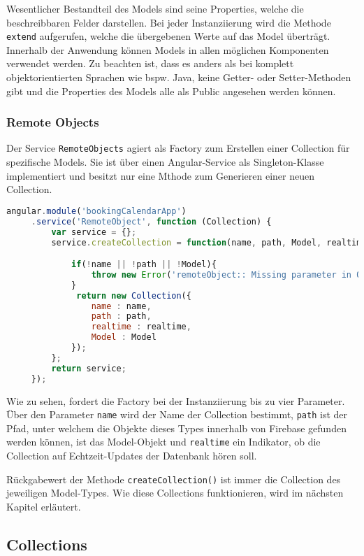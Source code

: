 Wesentlicher Bestandteil des Models sind seine Properties, welche die beschreibbaren Felder darstellen. Bei jeder Instanziierung wird die Methode \texttt{extend\(\)} aufgerufen, welche die
übergebenen Werte auf das Model überträgt.
Innerhalb der Anwendung können Models in allen möglichen Komponenten verwendet werden. Zu beachten ist, dass es anders als bei komplett objektorientierten Sprachen wie bspw. Java,
keine Getter- oder Setter-Methoden gibt und die Properties des Models alle als Public angesehen werden können.


\subsubsection{Remote Objects}
Der Service \texttt{RemoteObjects} agiert als Factory zum Erstellen einer Collection für spezifische Models. Sie ist über einen Angular-Service als Singleton-Klasse implementiert und besitzt
 nur eine Mthode zum Generieren einer neuen Collection.

 \begin{lstlisting}[language=Javascript, label=code_RemoteObject, caption=Code des RemoteObjects-Service]
 angular.module('bookingCalendarApp')
     .service('RemoteObject', function (Collection) {
         var service = {};
         service.createCollection = function(name, path, Model, realtime){

             if(!name || !path || !Model){
                 throw new Error('remoteObject:: Missing parameter in Object')
             }
              return new Collection({
                 name : name,
                 path : path,
                 realtime : realtime,
                 Model : Model
             });
         };
         return service;
     });
\end{lstlisting}

Wie zu sehen, fordert die Factory bei der Instanziierung bis zu vier Parameter. Über den Parameter \texttt{name} wird der Name der Collection bestimmt, \texttt{path} ist der Pfad, unter welchem die Objekte dieses Types
innerhalb von Firebase gefunden werden können,  ist das Model-Objekt und \texttt{realtime} ein Indikator, ob die Collection auf Echtzeit-Updates der Datenbank hören soll.

Rückgabewert der Methode \texttt{createCollection()} ist immer die Collection des jeweiligen Model-Types.
Wie diese Collections funktionieren, wird im nächsten Kapitel erläutert.

\subsection{Collections}

